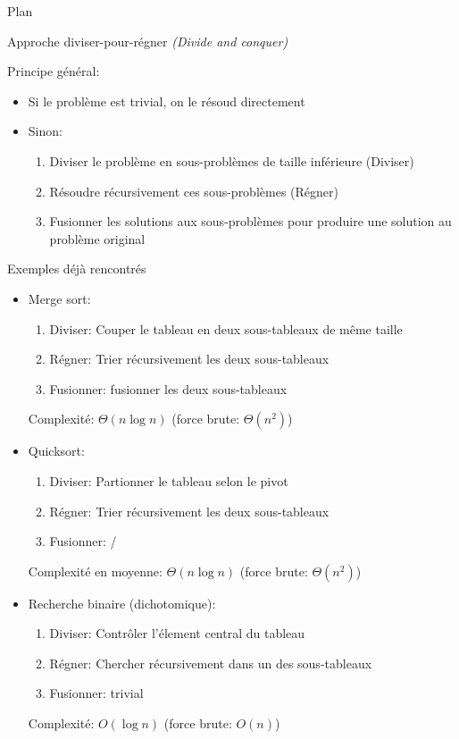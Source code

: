 \begin{frame}{Plan}


\end{frame}

\begin{frame}{Approche diviser-pour-régner {\it (Divide and conquer)}}

Principe général:
\begin{itemize}
\item Si le problème est trivial, on le résoud directement
\item Sinon:
\begin{enumerate}
\item Diviser le problème en sous-problèmes de taille inférieure (Diviser)
\item Résoudre récursivement ces sous-problèmes (Régner)
\item Fusionner les solutions aux sous-problèmes pour produire une solution au problème original
\end{enumerate}
\end{itemize}

\end{frame}

\begin{frame}{Exemples déjà rencontrés}

\begin{itemize}
\item \alert{Merge sort:}
\begin{enumerate}
\item Diviser: Couper le tableau en deux sous-tableaux de même taille
\item Régner: Trier récursivement les deux sous-tableaux
\item Fusionner: fusionner les deux sous-tableaux
\end{enumerate}
Complexité: $\Theta(n\log n)$ (force brute: $\Theta(n^2)$)
\item \alert{Quicksort:}
\begin{enumerate}
\item Diviser: Partionner le tableau selon le pivot
\item Régner: Trier récursivement les deux sous-tableaux
\item Fusionner: /
\end{enumerate}
Complexité en moyenne: $\Theta(n\log n)$ (force brute: $\Theta(n^2)$)
\item \alert{Recherche binaire} (dichotomique):
\begin{enumerate}
\item Diviser: Contrôler l'élement central du tableau
\item Régner: Chercher récursivement dans un des sous-tableaux
\item Fusionner: trivial
\end{enumerate}
Complexité: $O(\log n)$ (force brute: $O(n)$)
\end{itemize}

\end{frame}

